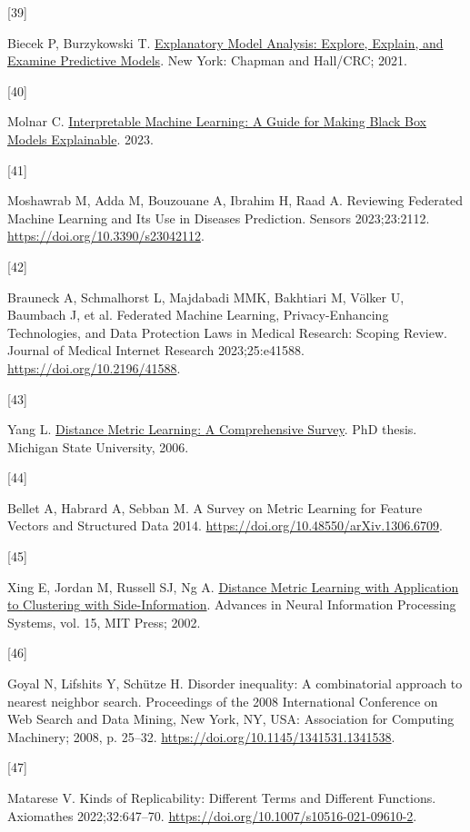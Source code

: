 \documentclass[preprint, 3p,
authoryear]{elsarticle} %
\newlength{\cslhangindent}
\newlength{\csllabelwidth}
\newlength{\cslentryspacingunit} %
\newenvironment{CSLReferences}[2] %
 {%
  \setlength{\parindent}{0pt}
  \ifodd #1
  \let\oldpar\par
  \def\par{\hangindent=\cslhangindent\oldpar}
  \fi
  \setlength{\parskip}{#2\cslentryspacingunit}
 }%
 {}
\newcommand{\CSLLeftMargin}[1]{\parbox[t]{\csllabelwidth}{#1}}
\newcommand{\CSLRightInline}[1]{\parbox[t]{\linewidth - \csllabelwidth}{#1}\break}
\begin{document}
\begin{CSLReferences}{0}{0}
\leavevmode{}%
\CSLLeftMargin{{[}39{]} }%
\CSLRightInline{Biecek P, Burzykowski T.
\href{https://ema.drwhy.ai/}{Explanatory {Model Analysis}: {Explore},
{Explain}, and {Examine Predictive Models}}. {New York}: {Chapman and
Hall/CRC}; 2021.}

\leavevmode{}%
\CSLLeftMargin{{[}40{]} }%
\CSLRightInline{Molnar C.
\href{https://christophm.github.io/interpretable-ml-book}{Interpretable
{Machine Learning}: {A Guide} for {Making Black Box Models
Explainable}}. 2023.}

\leavevmode{}%
\CSLLeftMargin{{[}41{]} }%
\CSLRightInline{Moshawrab M, Adda M, Bouzouane A, Ibrahim H, Raad A.
Reviewing {Federated Machine Learning} and {Its Use} in {Diseases
Prediction}. Sensors 2023;23:2112.
\url{https://doi.org/10.3390/s23042112}.}

\leavevmode{}%
\CSLLeftMargin{{[}42{]} }%
\CSLRightInline{Brauneck A, Schmalhorst L, Majdabadi MMK, Bakhtiari M,
Völker U, Baumbach J, et al. Federated {Machine Learning},
{Privacy-Enhancing Technologies}, and {Data Protection Laws} in {Medical
Research}: {Scoping Review}. Journal of Medical Internet Research
2023;25:e41588. \url{https://doi.org/10.2196/41588}.}

\leavevmode{}%
\CSLLeftMargin{{[}43{]} }%
\CSLRightInline{Yang L.
\href{http://www.cs.cmu.edu/~./liuy/frame_survey_v2.pdf}{Distance
{Metric Learning}: {A Comprehensive Survey}}. PhD thesis. Michigan State
University, 2006.}

\leavevmode{}%
\CSLLeftMargin{{[}44{]} }%
\CSLRightInline{Bellet A, Habrard A, Sebban M. A {Survey} on {Metric
Learning} for {Feature Vectors} and {Structured Data} 2014.
\url{https://doi.org/10.48550/arXiv.1306.6709}.}

\leavevmode{}%
\CSLLeftMargin{{[}45{]} }%
\CSLRightInline{Xing E, Jordan M, Russell SJ, Ng A.
\href{https://proceedings.neurips.cc/paper/2002/hash/c3e4035af2a1cde9f21e1ae1951ac80b-Abstract.html}{Distance
{Metric Learning} with {Application} to {Clustering} with
{Side-Information}}. Advances in {Neural Information Processing
Systems}, vol. 15, {MIT Press}; 2002.}

\leavevmode{}%
\CSLLeftMargin{{[}46{]} }%
\CSLRightInline{Goyal N, Lifshits Y, Schütze H. Disorder inequality: A
combinatorial approach to nearest neighbor search. Proceedings of the
2008 {International Conference} on {Web Search} and {Data Mining}, {New
York, NY, USA}: {Association for Computing Machinery}; 2008, p. 25--32.
\url{https://doi.org/10.1145/1341531.1341538}.}

\leavevmode{}%
\CSLLeftMargin{{[}47{]} }%
\CSLRightInline{Matarese V. Kinds of {Replicability}: {Different Terms}
and {Different Functions}. Axiomathes 2022;32:647--70.
\url{https://doi.org/10.1007/s10516-021-09610-2}.}

\end{CSLReferences}
\end{document}
